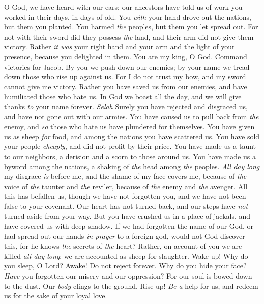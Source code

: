 \begin{biblechapter} %
 O God, we have heard with our ears; 
our ancestors have told us 
of work you worked in their days, 
in days of old.
\verse You \textit{with} your hand drove out the nations, 
but them you planted. 
You harmed \textit{the} peoples, 
but them you let spread out.
\verse For not with their sword 
did they possess \textit{the} land, 
and their arm did not give them victory. 
Rather \textit{it was} your right hand and your arm 
and the light of your presence, 
because you delighted in them.
\verse You are my king, O God. 
Command victories for Jacob.
\verse By you we push down our enemies; 
by your name we tread down those who rise up against us.
\verse For I do not trust my bow, 
and my sword cannot give me victory.
\verse Rather you have saved us from our enemies, 
and have humiliated those who hate us.
\verse In God we boast all the day, 
and we will give thanks \textit{to} your name forever. \textit{Selah}
\verse Surely you have rejected and disgraced us, 
and have not gone out with our armies.
\verse You have caused us to pull back from \textit{the} enemy, 
and \textit{so} those who hate us have plundered for themselves.
\verse You have given us as sheep \textit{for} food, 
and among the nations you have scattered us.
\verse You have sold your people \textit{cheaply}, 
and did not profit by their price.
\verse You have made us a taunt to our neighbors, 
a derision and a scorn to those around us.
\verse You have made us a byword among the nations, 
a shaking of \textit{the} head among \textit{the} peoples.
\verse \textit{All day long} my disgrace \textit{is} before me, 
and the shame of my face covers me,
\verse because of \textit{the} voice of \textit{the} taunter and \textit{the} reviler, 
because of \textit{the} enemy and \textit{the} avenger.
\verse All this has befallen us, though we have not forgotten you, 
and we have not been false to your covenant.
\verse Our heart has not turned back, 
and our steps have \textit{not} turned aside from your way.
\verse But you have crushed us in a place of jackals, 
and have covered us with deep shadow.
\verse If we had forgotten the name of our God, 
or had spread out our hands \textit{in prayer} to a foreign god,
\verse would not God discover this, 
for he knows \textit{the} secrets of \textit{the} heart?
\verse Rather, on account of you we are killed \textit{all day long}; 
we are accounted as sheep for slaughter.
\verse Wake up! Why do you sleep, O Lord? 
Awake! Do not reject forever.
\verse Why do you hide your face? 
\textit{Have} you forgotten our misery and our oppression?
\verse For our soul is bowed down to the dust. 
Our \textit{body} clings to the ground.
\verse Rise up! \textit{Be a} help for us, 
and redeem us for the sake of your loyal love.
\end{biblechapter}

